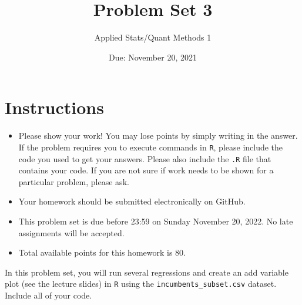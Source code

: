 \documentclass[12pt,letterpaper]{article}
\title{Problem Set 3}
\date{Due: November 20, 2021}
\author{Applied Stats/Quant Methods 1}
\begin{document}
	\maketitle
	\section*{Instructions}
	\begin{itemize}
		\item Please show your work! You may lose points by simply writing in the answer. If the problem requires you to execute commands in \texttt{R}, please include the code you used to get your answers. Please also include the \texttt{.R} file that contains your code. If you are not sure if work needs to be shown for a particular problem, please ask.
	\item Your homework should be submitted electronically on GitHub.
	\item This problem set is due before 23:59 on Sunday November 20, 2022. No late assignments will be accepted.
	\item Total available points for this homework is 80.
	\end{itemize}

		\vspace{.25cm}
	
\noindent In this problem set, you will run several regressions and create an add variable plot (see the lecture slides) in \texttt{R} using the \texttt{incumbents\_subset.csv} dataset. Include all of your code.

\begin{verbatim}
\end{verbatim}
	\vspace{.5cm}
\end{document}
